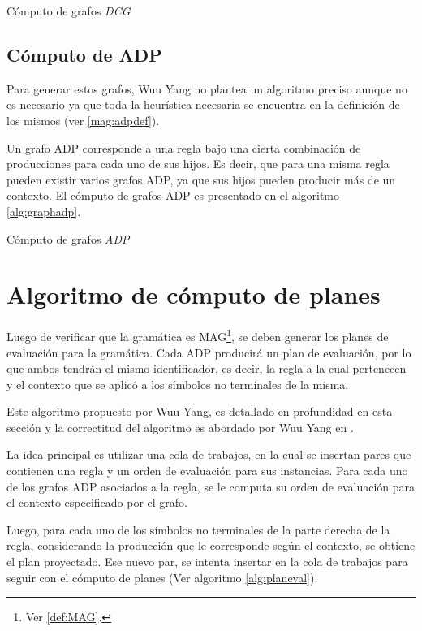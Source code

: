 \begin{algorithm}[!ht]

\caption{\label{alg:graphdcg} Cómputo de grafos \textit{DCG}}
\end{algorithm}

\subsection{Cómputo de ADP}
\label{subsec:alg-ADP} 
Para generar estos grafos, Wuu Yang no plantea un algoritmo preciso aunque no es necesario ya que toda la heurística necesaria se encuentra en la definición de los mismos (ver \ref{mag:adpdef}).

Un grafo ADP corresponde a una regla bajo una cierta combinación de producciones para cada uno de sus hijos. Es decir, que para una misma regla pueden existir varios grafos ADP, ya que sus hijos pueden producir más de un contexto. El cómputo de grafos ADP es presentado en el algoritmo \ref{alg:graphadp}.

\begin{algorithm}[!ht]

\caption{\label{alg:graphadp} Cómputo de grafos \textit{ADP}}
\end{algorithm}

\section{Algoritmo de cómputo de planes}
\label{sec:comp-planes}
Luego de verificar que la gramática es MAG\footnote{Ver \ref{def:MAG}.}, se deben generar los planes de evaluación para la gramática. Cada ADP producirá un plan de evaluación, por lo que ambos tendrán el mismo identificador, es decir, la regla a la cual pertenecen y el contexto que se aplicó a los símbolos no terminales de la misma.

Este algoritmo propuesto por Wuu Yang, es detallado en profundidad en esta sección y la correctitud del algoritmo es abordado por Wuu Yang en \cite{wuu-yang1}.

La idea principal es utilizar una cola de trabajos, en la cual se insertan pares que contienen una regla y un orden de evaluación para sus instancias. Para cada uno de los grafos ADP asociados a la regla, se le computa su orden de evaluación para el contexto especificado por el grafo.

Luego, para cada uno de los símbolos no terminales de la parte derecha de la regla, considerando la producción que le corresponde según el contexto, se obtiene el plan proyectado. Ese nuevo par, se intenta insertar en la cola de trabajos para seguir con el cómputo de planes (Ver algoritmo \ref{alg:planeval}).

